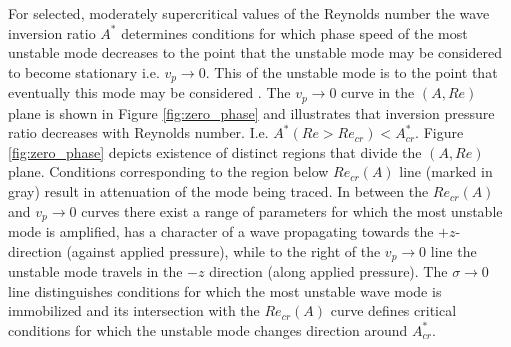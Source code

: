 \documentclass[lineno]{jfm}
\begin{document}
For selected, moderately supercritical values of the Reynolds number the wave inversion ratio $A^*$ determines conditions for which phase speed of the most unstable mode decreases to the point that the unstable mode may be considered to become stationary i.e. $v_p\to0$.
This   of the unstable mode is to the point that eventually this mode may be considered 
.
The $v_p\to0$ curve in the  $(A,Re)$ plane is shown in Figure \ref{fig:zero_phase}
and illustrates that inversion pressure ratio decreases with Reynolds number.
I.e. $A^{*}(Re>Re_{cr})<A^{*}_{cr}$.
Figure \ref{fig:zero_phase} depicts existence of distinct regions that divide the $(A,Re)$ plane.
Conditions corresponding to the region below $Re_{cr}(A)$ line (marked in gray) result in attenuation of the mode being traced.
In between the $Re_{cr}(A)$ and $v_p\to0$ curves there exist a range of parameters for which the most unstable mode is amplified, has a character of a wave propagating towards the $+z$-direction (against applied pressure), while to the right of the $v_p\to0$ line the unstable mode
travels in the $-z$ direction (along applied pressure).
The $\sigma\to0$ line distinguishes conditions for which the most unstable wave mode is immobilized and its intersection with the $Re_{cr}(A)$ curve defines critical conditions for which the unstable mode changes direction around $A^{*}_{cr}$.


\end{document}
